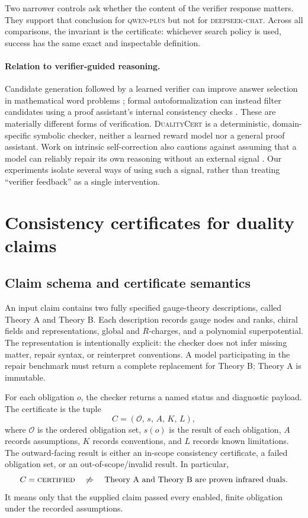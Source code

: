 \documentclass[11pt]{scrartcl}
\newcommand{\toolname}{\textsc{DualityCert}}
\newcommand{\dscode}{\textsc{deepseek-chat}}
\newcommand{\qwcode}{\textsc{qwen-plus}}
\begin{document}
Two narrower controls ask whether the content of the verifier response matters.
They support that conclusion for \qwcode{} but not for \dscode{}.  Across all
comparisons, the invariant is the certificate: whichever search policy is used,
success has the same exact and inspectable definition.

\paragraph{Relation to verifier-guided reasoning.}
Candidate generation followed by a learned verifier can improve answer
selection in mathematical word problems \cite{Cobbe:2021verifiers}; formal
autoformalization can instead filter candidates using a proof assistant's
internal consistency checks \cite{Zhou:2024verify}.  These are materially
different forms of verification.  \toolname{} is a deterministic,
domain-specific symbolic checker, neither a learned reward model nor a general
proof assistant.  Work on intrinsic self-correction also cautions against
assuming that a model can reliably repair its own reasoning without an external
signal \cite{Huang:2024selfcorrect}.  Our experiments isolate several ways of
using such a signal, rather than treating ``verifier feedback'' as a single
intervention.

\section{Consistency certificates for duality claims}
\label{sec:certificates}

\subsection{Claim schema and certificate semantics}

An input claim contains two fully specified gauge-theory descriptions, called
Theory A and Theory B.  Each description records gauge nodes and ranks, chiral
fields and representations, global and $R$-charges, and a polynomial
superpotential.  The representation is intentionally explicit: the checker
does not infer missing matter, repair syntax, or reinterpret conventions.  A
model participating in the repair benchmark must return a complete replacement
for Theory B; Theory A is immutable.

For each obligation $o$, the checker returns a named status and diagnostic
payload.  The certificate is the tuple
\begin{equation}
  C=(\mathcal O,\,s,\,A,\,K,\,L),
\end{equation}
where $\mathcal O$ is the ordered obligation set, $s(o)$ is the result of each
obligation, $A$ records assumptions, $K$ records conventions, and $L$ records
known limitations.  The outward-facing result is either an in-scope consistency
certificate, a failed obligation set, or an out-of-scope/invalid result.  In
particular,
\begin{equation}
  C=\textsc{certified}\quad\not\Rightarrow\quad
  \text{Theory A and Theory B are proven infrared duals}.
\end{equation}
It means only that the supplied claim passed every enabled, finite obligation
under the recorded assumptions.
\end{document}
